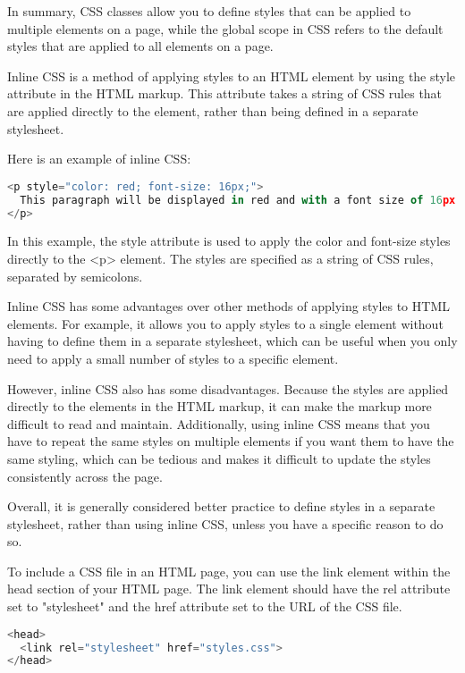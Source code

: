 {In summary, CSS classes allow you to define styles that can be applied to multiple elements on a page, while the global scope in CSS refers to the default styles that are applied to all elements on a page.



Inline CSS is a method of applying styles to an HTML element by using the style attribute in the HTML markup. This attribute takes a string of CSS rules that are applied directly to the element, rather than being defined in a separate stylesheet.

Here is an example of inline CSS:
\begin{lstlisting}[language=Javascript, caption=Inline CSS]
<p style="color: red; font-size: 16px;">
  This paragraph will be displayed in red and with a font size of 16px.
</p>

\end{lstlisting}

In this example, the style attribute is used to apply the color and font-size styles directly to the <p> element. The styles are specified as a string of CSS rules, separated by semicolons.

Inline CSS has some advantages over other methods of applying styles to HTML elements. For example, it allows you to apply styles to a single element without having to define them in a separate stylesheet, which can be useful when you only need to apply a small number of styles to a specific element.

However, inline CSS also has some disadvantages. Because the styles are applied directly to the elements in the HTML markup, it can make the markup more difficult to read and maintain. Additionally, using inline CSS means that you have to repeat the same styles on multiple elements if you want them to have the same styling, which can be tedious and makes it difficult to update the styles consistently across the page.

Overall, it is generally considered better practice to define styles in a separate stylesheet, rather than using inline CSS, unless you have a specific reason to do so.



To include a CSS file in an HTML page, you can use the link element within the head section of your HTML page. The link element should have the rel attribute set to "stylesheet" and the href attribute set to the URL of the CSS file.

\begin{lstlisting}[language=Javascript, caption=CSS stylesheet in html]
<head>
  <link rel="stylesheet" href="styles.css">
</head>
\end{lstlisting}

}
